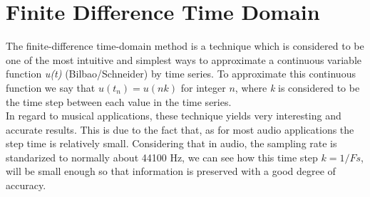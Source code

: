 %
%
%


\chapter{Finite Difference Time Domain}
\label{chapter2}
The finite-difference time-domain method is a technique which is considered to be one of the most intuitive and simplest ways to approximate a continuous variable function \textit{u(t)} (Bilbao/Schneider) by time series. To approximate this continuous function we say that $u(t_{n})=u(nk)$ for integer $n$, where \textit{k} is considered to be the time step between each value in the time series.\\
In regard to musical applications, these technique yields very interesting and accurate results. This is due to the fact that, as for most audio applications the step time is relatively small. Considering that in audio, the sampling rate is standarized to normally about 44100 Hz, we can see how this time step $k=1/Fs$, will be small enough so that information is preserved with a good degree of accuracy. 

